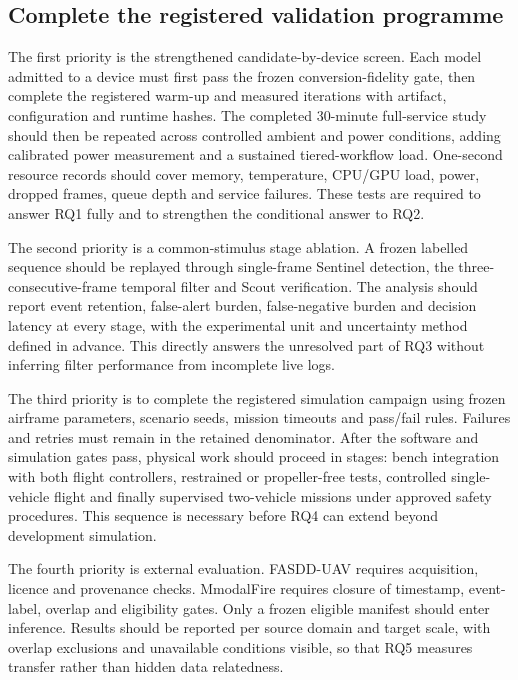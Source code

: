 \subsection{Complete the registered validation programme}

The first priority is the strengthened candidate-by-device screen. Each model
admitted to a device must first pass the frozen conversion-fidelity gate, then
complete the registered warm-up and measured iterations with artifact,
configuration and runtime hashes. The completed 30-minute full-service study
should then be repeated across controlled ambient and power conditions, adding
calibrated power measurement and a sustained tiered-workflow load. One-second
resource records should cover memory, temperature, CPU/GPU load, power, dropped
frames, queue depth and service failures. These tests are required to answer
RQ1 fully and to strengthen the conditional answer to RQ2.

The second priority is a common-stimulus stage ablation. A frozen labelled
sequence should be replayed through single-frame Sentinel detection, the
three-consecutive-frame temporal filter and Scout verification. The analysis
should report event retention, false-alert burden, false-negative burden and
decision latency at every stage, with the experimental unit and uncertainty
method defined in advance. This directly answers the unresolved part of RQ3
without inferring filter performance from incomplete live logs.

The third priority is to complete the registered simulation campaign using
frozen airframe parameters, scenario seeds, mission timeouts and pass/fail
rules. Failures and retries must remain in the retained denominator. After the
software and simulation gates pass, physical work should proceed in stages:
bench integration with both flight controllers, restrained or propeller-free
tests, controlled single-vehicle flight and finally supervised two-vehicle
missions under approved safety procedures. This sequence is necessary before
RQ4 can extend beyond development simulation.

The fourth priority is external evaluation. FASDD-UAV requires acquisition,
licence and provenance checks. MmodalFire requires closure of timestamp,
event-label, overlap and eligibility gates. Only a frozen eligible manifest
should enter inference. Results should be reported per source domain and target
scale, with overlap exclusions and unavailable conditions visible, so that RQ5
measures transfer rather than hidden data relatedness.

